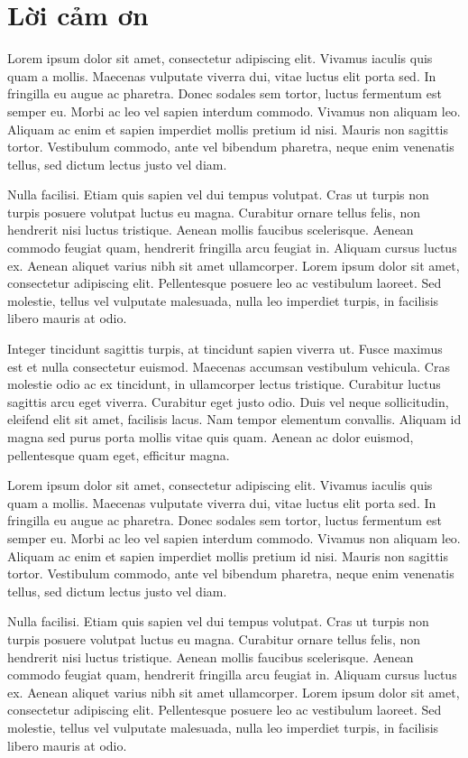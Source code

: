 \clearpage
{}

\chapter*{Lời cảm ơn}
Lorem ipsum dolor sit amet, consectetur adipiscing elit. Vivamus iaculis quis quam a mollis. Maecenas vulputate viverra dui, vitae luctus elit porta sed. In fringilla eu augue ac pharetra. Donec sodales sem tortor, luctus fermentum est semper eu. Morbi ac leo vel sapien interdum commodo. Vivamus non aliquam leo. Aliquam ac enim et sapien imperdiet mollis pretium id nisi. Mauris non sagittis tortor. Vestibulum commodo, ante vel bibendum pharetra, neque enim venenatis tellus, sed dictum lectus justo vel diam.\par
Nulla facilisi. Etiam quis sapien vel dui tempus volutpat. Cras ut turpis non turpis posuere volutpat luctus eu magna. Curabitur ornare tellus felis, non hendrerit nisi luctus tristique. Aenean mollis faucibus scelerisque. Aenean commodo feugiat quam, hendrerit fringilla arcu feugiat in. Aliquam cursus luctus ex. Aenean aliquet varius nibh sit amet ullamcorper. Lorem ipsum dolor sit amet, consectetur adipiscing elit. Pellentesque posuere leo ac vestibulum laoreet. Sed molestie, tellus vel vulputate malesuada, nulla leo imperdiet turpis, in facilisis libero mauris at odio.\par
Integer tincidunt sagittis turpis, at tincidunt sapien viverra ut. Fusce maximus est et nulla consectetur euismod. Maecenas accumsan vestibulum vehicula. Cras molestie odio ac ex tincidunt, in ullamcorper lectus tristique. Curabitur luctus sagittis arcu eget viverra. Curabitur eget justo odio. Duis vel neque sollicitudin, eleifend elit sit amet, facilisis lacus. Nam tempor elementum convallis. Aliquam id magna sed purus porta mollis vitae quis quam. Aenean ac dolor euismod, pellentesque quam eget, efficitur magna.\par
Lorem ipsum dolor sit amet, consectetur adipiscing elit. Vivamus iaculis quis quam a mollis. Maecenas vulputate viverra dui, vitae luctus elit porta sed. In fringilla eu augue ac pharetra. Donec sodales sem tortor, luctus fermentum est semper eu. Morbi ac leo vel sapien interdum commodo. Vivamus non aliquam leo. Aliquam ac enim et sapien imperdiet mollis pretium id nisi. Mauris non sagittis tortor. Vestibulum commodo, ante vel bibendum pharetra, neque enim venenatis tellus, sed dictum lectus justo vel diam.\par
Nulla facilisi. Etiam quis sapien vel dui tempus volutpat. Cras ut turpis non turpis posuere volutpat luctus eu magna. Curabitur ornare tellus felis, non hendrerit nisi luctus tristique. Aenean mollis faucibus scelerisque. Aenean commodo feugiat quam, hendrerit fringilla arcu feugiat in. Aliquam cursus luctus ex. Aenean aliquet varius nibh sit amet ullamcorper. Lorem ipsum dolor sit amet, consectetur adipiscing elit. Pellentesque posuere leo ac vestibulum laoreet. Sed molestie, tellus vel vulputate malesuada, nulla leo imperdiet turpis, in facilisis libero mauris at odio.\par
